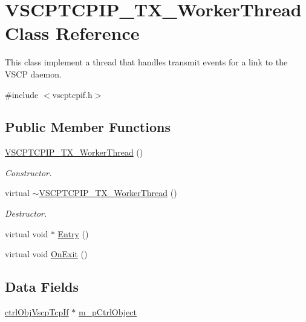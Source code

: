 \hypertarget{class_v_s_c_p_t_c_p_i_p___t_x___worker_thread}{
\section{VSCPTCPIP\_\-TX\_\-WorkerThread Class Reference}
\label{d9/d6b/class_v_s_c_p_t_c_p_i_p___t_x___worker_thread}
}


This class implement a thread that handles transmit events for a link to the VSCP daemon.  




{\ttfamily \#include $<$vscptcpif.h$>$}

\subsection*{Public Member Functions}
\begin{DoxyCompactItemize}
\item 
\hypertarget{class_v_s_c_p_t_c_p_i_p___t_x___worker_thread_a85ff4b9c3254ef99a8805268ea9216e6}{
\hyperlink{class_v_s_c_p_t_c_p_i_p___t_x___worker_thread_a85ff4b9c3254ef99a8805268ea9216e6}{VSCPTCPIP\_\-TX\_\-WorkerThread} ()}
\label{d9/d6b/class_v_s_c_p_t_c_p_i_p___t_x___worker_thread_a85ff4b9c3254ef99a8805268ea9216e6}

\begin{DoxyCompactList}\small\item\em Constructor. \end{DoxyCompactList}\item 
\hypertarget{class_v_s_c_p_t_c_p_i_p___t_x___worker_thread_a17678da89166e2534d2df6782cb1c666}{
virtual \hyperlink{class_v_s_c_p_t_c_p_i_p___t_x___worker_thread_a17678da89166e2534d2df6782cb1c666}{$\sim$VSCPTCPIP\_\-TX\_\-WorkerThread} ()}
\label{d9/d6b/class_v_s_c_p_t_c_p_i_p___t_x___worker_thread_a17678da89166e2534d2df6782cb1c666}

\begin{DoxyCompactList}\small\item\em Destructor. \end{DoxyCompactList}\item 
virtual void $\ast$ \hyperlink{class_v_s_c_p_t_c_p_i_p___t_x___worker_thread_ab58e6b94a57d07d55a445f204a5d2f23}{Entry} ()
\item 
virtual void \hyperlink{class_v_s_c_p_t_c_p_i_p___t_x___worker_thread_a432ba960371cce80994cf4e44a3f66b1}{OnExit} ()
\end{DoxyCompactItemize}
\subsection*{Data Fields}
\begin{DoxyCompactItemize}
\item 
\hyperlink{classctrl_obj_vscp_tcp_if}{ctrlObjVscpTcpIf} $\ast$ \hyperlink{class_v_s_c_p_t_c_p_i_p___t_x___worker_thread_a987f7672856a7f61372c995773c3e63d}{m\_\-pCtrlObject}
\end{DoxyCompactItemize}


